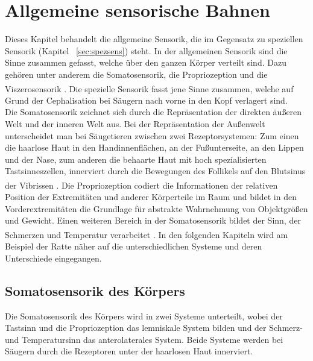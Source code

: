\documentclass[12pt,a4paper,pdftex]{article}
\begin{document}


\newpage
\section{Allgemeine sensorische Bahnen} \label{sec:sensorische_Bahnen}
Dieses Kapitel behandelt die allgemeine Sensorik,  die im Gegensatz zu speziellen Sensorik (Kapitel~ \ref{sec:spezsens}) steht. In der allgemeinen Sensorik sind die Sinne zusammen gefasst, welche über den ganzen Körper verteilt sind. Dazu gehören unter anderem die Somatosensorik, die Propriozeption und die Viszerosensorik \textsuperscript{\cite[22]{kandel2013principles}}. Die spezielle Sensorik  fasst jene Sinne zusammen, welche auf Grund der Cephalisation bei Säugern nach vorne in den Kopf verlagert sind.
\\
\noindent
Die Somatosensorik zeichnet sich durch die Repräsentation der direkten äußeren Welt und der inneren Welt aus. Bei der Repräsentation der Außenwelt unterscheidet man bei Säugetieren zwischen zwei Rezeptorsystemen: Zum einen die haarlose Haut in den Handinnenflächen, an der Fußunterseite, an den Lippen und der Nase, zum anderen die behaarte Haut mit hoch spezialisierten Tastsinneszellen, innerviert durch die Bewegungen des Follikels auf den Blutsinus  der Vibrissen  \textsuperscript{\cite[24]{paxinos2014rat}}.
Die Propriozeption codiert die Informationen der relativen Position der Extremitäten und anderer Körperteile im Raum und bildet in den Vorderextremitäten die Grundlage für abstrakte Wahrnehmung von Objektgrößen und Gewicht. Einen weiteren Bereich in der Somatosensorik bildet der Sinn, der Schmerzen und Temperatur verarbeitet \textsuperscript{\cite[24]{paxinos2014rat}}.
In den folgenden Kapiteln wird am Beispiel der Ratte näher auf die unterschiedlichen Systeme und deren Unterschiede eingegangen.


\subsection{Somatosensorik  des Körpers}
Die Somatosensorik des Körpers wird in zwei Systeme unterteilt, wobei der Tastsinn  und die Propriozeption das lemniskale System  bilden und der Schmerz- und Temperatursinn  das anterolaterales System.  Beide Systeme werden bei Säugern durch die Rezeptoren unter der haarlosen Haut innerviert.
\end{document}
